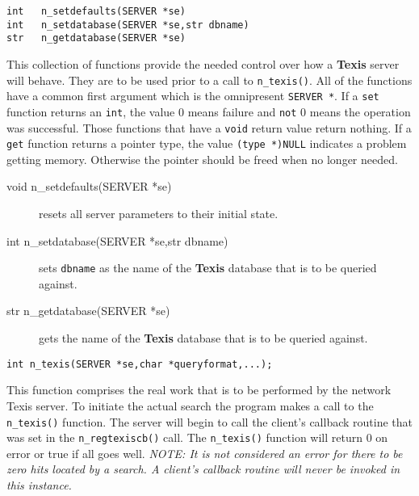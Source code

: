 

\SYNOPSIS
\begin{verbatim}
int   n_setdefaults(SERVER *se)
int   n_setdatabase(SERVER *se,str dbname)
str   n_getdatabase(SERVER *se)
\end{verbatim}

\DESCRIPTION

This collection of functions provide the needed control over how a {\bf
Texis} server will behave.  They are to be used prior to a call to
\verb`n_texis()`.  All of the functions have a common first argument
which is the omnipresent \verb`SERVER *`.  If a \verb`set` function
returns an \verb`int`, the value 0 means failure and \verb`not` 0 means
the operation was successful.  Those functions that have a \verb`void`
return value return nothing.  If a \verb`get` function returns a pointer
type, the value \verb`(type *)NULL` indicates a problem getting memory.
Otherwise the pointer should be freed when no longer needed.

\begin{description}
\item[void  n\_setdefaults(SERVER *se)]

     resets all server parameters to their initial state.

\item[int   n\_setdatabase(SERVER *se,str dbname)]

     sets \verb`dbname` as the name of the {\bf Texis} database that is
     to be queried against.

\item[str   n\_getdatabase(SERVER *se)]

     gets the name of the {\bf Texis} database that is
     to be queried against.
\end{description}



\SYNOPSIS
\begin{verbatim}
int n_texis(SERVER *se,char *queryformat,...);
\end{verbatim}

\DESCRIPTION

This function comprises the real work that is to be performed by the
network Texis server.  To initiate the actual search the program makes a
call to the \verb`n_texis()` function.  The server will begin to call
the client's callback routine that was set in the \verb`n_regtexiscb()`
call.  The \verb`n_texis()` function will return 0 on error or true if
all goes well.  {\em NOTE:  It is not considered an error for there to
be zero hits located by a search.  A client's callback routine will
never be invoked in this instance.  }

